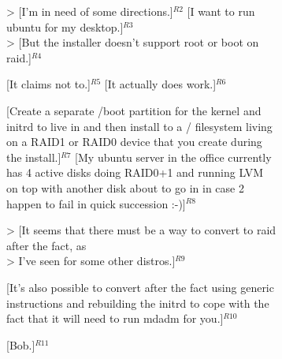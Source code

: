 \begin{figure}
{{\begin{subfigure}[b]{0.9\textwidth}
> [I'm in need of some directions.]$^{R2}$  [I want to run ubuntu for my desktop.]$^{R3}$\\
> [But the installer doesn't support root or boot on raid.]$^{R4}$\vspace{0.1cm}

[It claims not to.]$^{R5}$ [It actually does work.]$^{R6}$\vspace{0.1cm}

[Create a separate /boot partition for the kernel and initrd to live in %
and then install to a / filesystem living on a RAID1 or RAID0 device %
that you create during the install.]$^{R7}$ [My ubuntu server in the office %
currently has 4 active disks doing RAID0+1 and running LVM on top with %
another disk about to go in in case 2 happen to fail in quick %
succession :-)]$^{R8}$\vspace{0.1cm}

> [It seems that there must be a way to convert to raid after the fact, as\\
> I've seen for some other distros.]$^{R9}$\vspace{0.1cm}

[It's also possible to convert after the fact using generic %
instructions and rebuilding the initrd to cope with the fact that it %
will need to run mdadm for you.]$^{R10}$\vspace{0.1cm}


[Bob.]$^{R11}$ %



\end{subfigure}}}
\end{figure}
